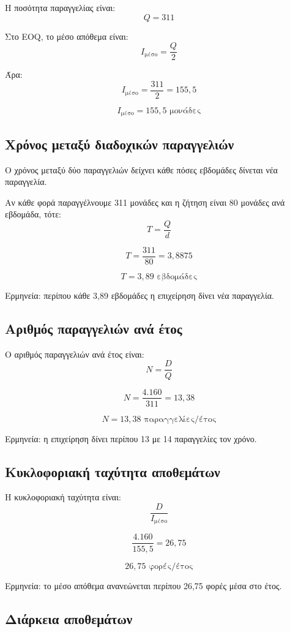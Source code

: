 \documentclass[12pt,a4paper]{article}
\begin{document}
Η ποσότητα παραγγελίας είναι:
\[
Q=311
\]

Στο EOQ, το μέσο απόθεμα είναι:
\[
I_{\text{μέσο}}=\frac{Q}{2}
\]

Άρα:
\[
I_{\text{μέσο}}=\frac{311}{2}=155{,}5
\]

\[
\boxed{I_{\text{μέσο}}=155{,}5 \text{ μονάδες}}
\]

\subsection{Χρόνος μεταξύ διαδοχικών παραγγελιών}

Ο χρόνος μεταξύ δύο παραγγελιών δείχνει κάθε πόσες εβδομάδες δίνεται νέα παραγγελία.

Αν κάθε φορά παραγγέλνουμε 311 μονάδες και η ζήτηση είναι 80 μονάδες ανά εβδομάδα, τότε:
\[
T=\frac{Q}{d}
\]

\[
T=\frac{311}{80}=3{,}8875
\]

\[
\boxed{T=3{,}89 \text{ εβδομάδες}}
\]

Ερμηνεία: περίπου κάθε 3,89 εβδομάδες η επιχείρηση δίνει νέα παραγγελία.

\subsection{Αριθμός παραγγελιών ανά έτος}

Ο αριθμός παραγγελιών ανά έτος είναι:
\[
N=\frac{D}{Q}
\]

\[
N=\frac{4.160}{311}=13{,}38
\]

\[
\boxed{N=13{,}38 \text{ παραγγελίες/έτος}}
\]

Ερμηνεία: η επιχείρηση δίνει περίπου 13 με 14 παραγγελίες τον χρόνο.

\subsection{Κυκλοφοριακή ταχύτητα αποθεμάτων}

Η κυκλοφοριακή ταχύτητα είναι:
\[
\frac{D}{I_{\text{μέσο}}}
\]

\[
\frac{4.160}{155{,}5}=26{,}75
\]

\[
\boxed{26{,}75 \text{ φορές/έτος}}
\]

Ερμηνεία: το μέσο απόθεμα ανανεώνεται περίπου 26,75 φορές μέσα στο έτος.

\subsection{Διάρκεια αποθεμάτων}
\end{document}
